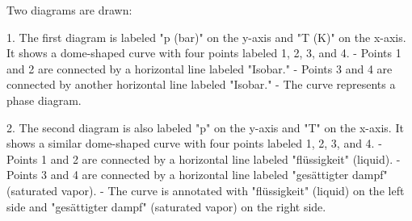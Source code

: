 Two diagrams are drawn:  

1. The first diagram is labeled "p (bar)" on the y-axis and "T (K)" on the x-axis. It shows a dome-shaped curve with four points labeled 1, 2, 3, and 4.  
   - Points 1 and 2 are connected by a horizontal line labeled "Isobar."  
   - Points 3 and 4 are connected by another horizontal line labeled "Isobar."  
   - The curve represents a phase diagram.  

2. The second diagram is also labeled "p" on the y-axis and "T" on the x-axis. It shows a similar dome-shaped curve with four points labeled 1, 2, 3, and 4.  
   - Points 1 and 2 are connected by a horizontal line labeled "flüssigkeit" (liquid).  
   - Points 3 and 4 are connected by a horizontal line labeled "gesättigter dampf" (saturated vapor).  
   - The curve is annotated with "flüssigkeit" (liquid) on the left side and "gesättigter dampf" (saturated vapor) on the right side.